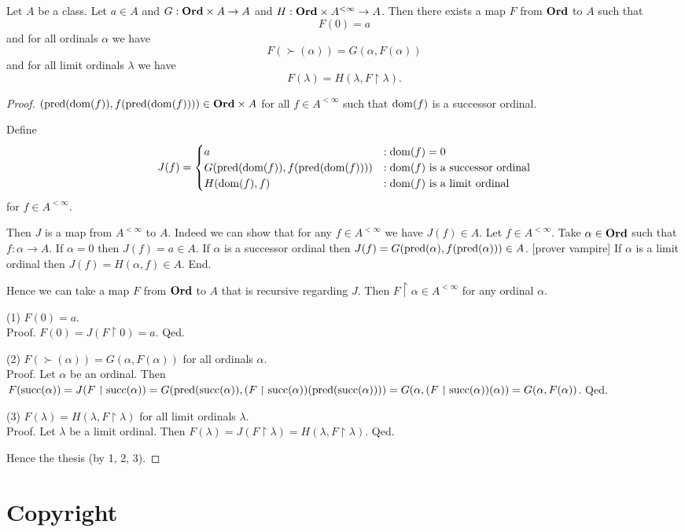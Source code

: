 \documentclass{article}
\begin{document}
  \begin{forthel}
    \begin{corollary*}[id=recursion]
      Let $A$ be a class.
      Let $a \in A$ and $G : \textbf{Ord} \times A \to A$ and $H : \textbf{Ord} \times A^{< \infty} \to A$.
      Then there exists a map $F$ from $\textbf{Ord}$ to $A$ such that
      \[ F(0) = a \]
      and for all ordinals $\alpha$ we have
      \[ F(\succ(\alpha)) = G(\alpha, F(\alpha)) \]
      and for all limit ordinals $\lambda$ we have
      \[ F(\lambda) = H(\lambda, F \restriction \lambda). \]
    \end{corollary*}
    \begin{proof}
      $(\textrm{pred}(\operatorname{dom}(f)), f(\textrm{pred}(\operatorname{dom}(f)))) \in \textbf{Ord} \times A$ for all $f \in A^{< \infty}$ such that $\operatorname{dom}(f)$ is a successor ordinal.

      Define  \[ J(f) =
        \begin{cases}
          a
          & : \operatorname{dom}(f) = 0
          \\
          G(\textrm{pred}(\operatorname{dom}(f)), f(\textrm{pred}(\operatorname{dom}(f))))
          & : \text{$\operatorname{dom}(f)$ is a successor ordinal}
          \\
          H(\operatorname{dom}(f), f)
          & : \text{$\operatorname{dom}(f)$ is a limit ordinal}
        \end{cases} \]
      for $f \in A^{< \infty}$.

      Then $J$ is a map from $A^{< \infty}$ to $A$.
      Indeed we can show that for any $f \in A^{< \infty}$ we have $J(f) \in A$.
        Let $f \in A^{< \infty}$.
        Take $\alpha \in \textbf{Ord}$ such that $f : \alpha \to A$.
        If $\alpha = 0$ then $J(f) = a \in A$.
        If $\alpha$ is a successor ordinal then $J(f) =
        G(\textrm{pred}(\alpha), f(\textrm{pred}(\alpha))) \in A$.
        [prover vampire]
        If $\alpha$ is a limit ordinal then $J(f) = H(\alpha, f) \in A$.
      End.

      Hence we can take a map $F$ from $\textbf{Ord}$ to $A$ that is recursive regarding $J$.
      Then $F \restriction \alpha \in A^{< \infty}$ for any ordinal $\alpha$.

      (1) $F(0) = a$. \\
      Proof.
        $F(0)
          = J(F \restriction 0)
          = a$.
      Qed.

      (2) $F(\succ(\alpha)) = G(\alpha, F(\alpha))$ for all ordinals $\alpha$. \\
      Proof.
        Let $\alpha$ be an ordinal.
        Then $F(\textrm{succ}(\alpha))
          = J(F \restriction \textrm{succ}(\alpha))
          = G(\textrm{pred}(\textrm{succ}(\alpha)), (F \restriction \textrm{succ}(\alpha))(\textrm{pred}(\textrm{succ}(\alpha))))
          = G(\alpha, (F \restriction \textrm{succ}(\alpha))(\alpha))
          = G(\alpha, F(\alpha))$.
      Qed.

      (3) $F(\lambda) = H(\lambda, F \restriction \lambda)$ for all limit ordinals $\lambda$. \\
      Proof.
        Let $\lambda$ be a limit ordinal.
        Then $F(\lambda)
          = J(F \restriction \lambda)
          = H(\lambda, F \restriction \lambda)$.
      Qed.

      Hence the thesis (by 1, 2, 3).
    \end{proof}
  \end{forthel}

  \printbibliography

  \section*{Copyright}
  \doclicenseThis
\end{document}
